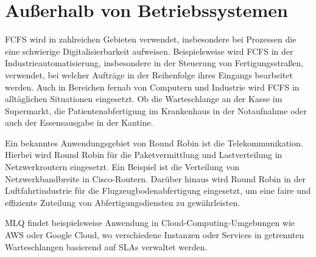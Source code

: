 
\section{Außerhalb von Betriebssystemen}
\ac{FCFS} wird in zahlreichen Gebieten verwendet, insbesondere bei Prozessen die eine schwierige Digitalisierbarkeit aufweisen. Beispielsweise wird \ac{FCFS} in der Industrieautomatisierung, insbesondere in der Steuerung von Fertigungsstraßen, verwendet, bei welcher Aufträge in der Reihenfolge ihres Eingangs bearbeitet werden. %
Auch in Bereichen fernab von Computern und Industrie wird \ac{FCFS} in alltäglichen Situationen eingesetzt. Ob die Warteschlange an der Kasse im Supermarkt, die Patientenabfertigung im Krankenhaus in der Notaufnahme oder auch der Essensausgabe in der Kantine. 

Ein bekanntes Anwendungsgebiet von Round Robin ist die Telekommunikation. Hierbei wird Round Robin für die Paketvermittlung und Lastverteilung in Netzwerkroutern eingesetzt. Ein Beispiel ist die Verteilung von Netzwerkbandbreite in Cisco-Routern. %
Darüber hinaus wird Round Robin in der Luftfahrtindustrie für die Flugzeugbodenabfertigung eingesetzt, um eine faire und effiziente Zuteilung von Abfertigungsdiensten zu gewährleisten. %

\ac{MLQ} findet beispielsweise Anwendung in Cloud-Computing-Umgebungen wie AWS oder Google Cloud, wo verschiedene Instanzen oder Services in getrennten Warteschlangen basierend auf SLAs verwaltet werden. %



